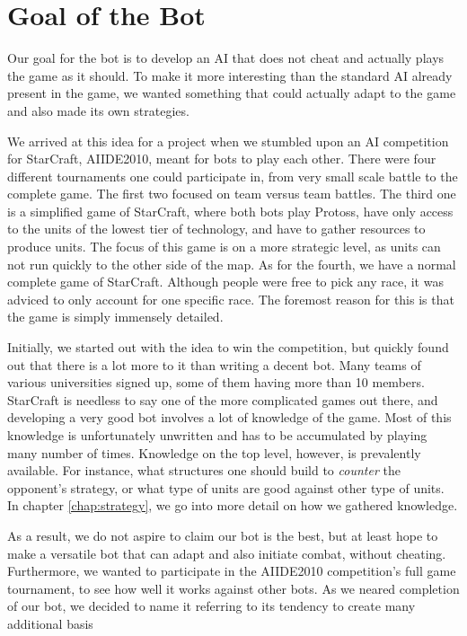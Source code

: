 \section{Goal of the Bot}
Our goal for the bot is to develop an AI that does not cheat and actually plays the game as it should. To make it more interesting than the standard AI already present in the game, we wanted something that could actually adapt to the game and also made its own strategies.

We arrived at this idea for a project when we stumbled upon an AI competition for StarCraft, AIIDE2010, meant for bots to play each other. There were four different tournaments one could participate in, from very small scale battle to the complete game. The first two focused on team versus team battles. The third one is a simplified game of StarCraft, where both bots play Protoss, have only access to the units of the lowest tier of technology, and have to gather resources to produce units. The focus of this game is on a more strategic level, as units can not run quickly to the other side of the map. As for the fourth, we have a normal complete game of StarCraft. Although people were free to pick any race, it was adviced to only account for one specific race. The foremost reason for this is that the game is simply immensely detailed.

Initially, we started out with the idea to win the competition, but quickly found out that there is a lot more to it than writing a decent bot. Many teams of various universities signed up, some of them having more than 10 members. StarCraft is needless to say one of the more complicated games out there, and developing a very good bot involves a lot of knowledge of the game. Most of this knowledge is unfortunately unwritten and has to be accumulated by playing many number of times. Knowledge on the top level, however, is prevalently available. For instance, what structures one should build to \emph{counter} the opponent's strategy, or what type of units are good against other type of units. In chapter \ref{chap:strategy}, we go into more detail on how we gathered knowledge.

As a result, we do not aspire to claim our bot is the best, but at least hope to make a versatile bot that can adapt and also initiate combat, without cheating. Furthermore, we wanted to participate in the AIIDE2010 competition's full game tournament, to see how well it works against other bots. As we neared completion of our bot, we decided to name it \massexpand{} referring to its tendency to create many additional basis


